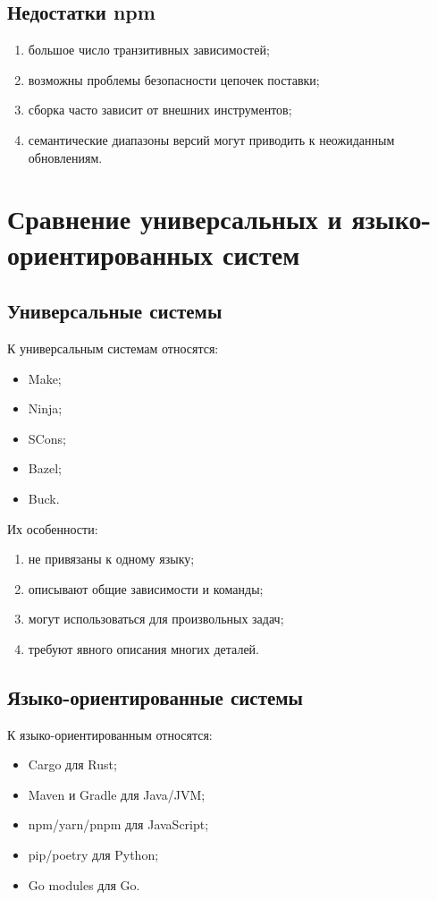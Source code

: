 \documentclass[12pt,a4paper]{article}
\begin{document}
\subsection{Недостатки npm}

\begin{enumerate}
    \item большое число транзитивных зависимостей;
    \item возможны проблемы безопасности цепочек поставки;
    \item сборка часто зависит от внешних инструментов;
    \item семантические диапазоны версий могут приводить к неожиданным обновлениям.
\end{enumerate}

\section{Сравнение универсальных и языко-ориентированных систем}

\subsection{Универсальные системы}

К универсальным системам относятся:
\begin{itemize}
    \item Make;
    \item Ninja;
    \item SCons;
    \item Bazel;
    \item Buck.
\end{itemize}

Их особенности:
\begin{enumerate}
    \item не привязаны к одному языку;
    \item описывают общие зависимости и команды;
    \item могут использоваться для произвольных задач;
    \item требуют явного описания многих деталей.
\end{enumerate}

\subsection{Языко-ориентированные системы}

К языко-ориентированным относятся:
\begin{itemize}
    \item Cargo для Rust;
    \item Maven и Gradle для Java/JVM;
    \item npm/yarn/pnpm для JavaScript;
    \item pip/poetry для Python;
    \item Go modules для Go.
\end{itemize}
\end{document}
